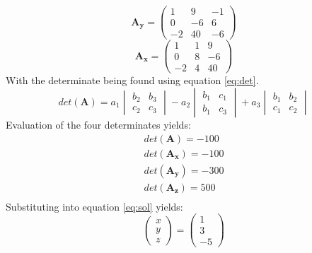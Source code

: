 \begin{enumerate}
\begin{equation*}
	\boldsymbol{A_y}=
	\begin{pmatrix}
		1&9&-1\\0&-6&6\\-2&40&-6
	\end{pmatrix}
\end{equation*}
\begin{equation*}
	\boldsymbol{A_x}=
	\begin{pmatrix}
		1&1&9\\0&8&-6\\-2&4&40
	\end{pmatrix}
\end{equation*}
With the determinate being found using equation \ref{eq:det}.
\begin{equation}
	det(\boldsymbol{A})= a_1 \begin{vmatrix} b_2 & b_3 \\ c_2 & c_3\end{vmatrix}
	    -a_2 \begin{vmatrix} b_1 & c_1 \\ b_1 & c_3\end{vmatrix}
	   +a_3\begin{vmatrix} b_1 & b_2 \\ c_1 & c_2\end{vmatrix}
	\label{eq:det}
\end{equation}
Evaluation of the four determinates yields:
\begin{align*}
	det(\boldsymbol{A})=-100\\
	det(\boldsymbol{A_x})=-100\\
	det(\boldsymbol{A_y})=-300\\
	det(\boldsymbol{A_z})=500\\
\end{align*}
Substituting into equation \ref{eq:sol} yields:
\begin{equation*}
	\boxed{
	\begin{pmatrix}
		x\\y\\z
	\end{pmatrix}
	=
	\begin{pmatrix}
	1\\3\\-5
	\end{pmatrix}}
\end{equation*}


\end{enumerate}
